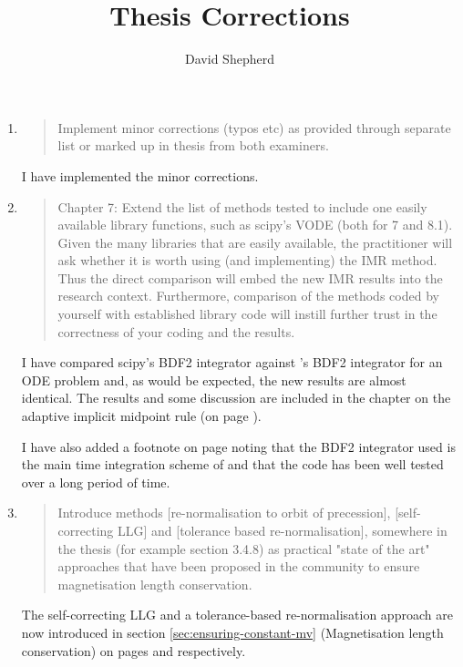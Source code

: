 \documentclass[12pt,a4paper,pdftex]{article}
\title{Thesis Corrections}
\author{David Shepherd}
\begin{document}
\maketitle


\begin{enumerate}
\item
  \begin{quotation}
    Implement minor corrections (typos etc) as provided through
    separate list or marked up in thesis from both examiners.
  \end{quotation}
  I have implemented the minor corrections.

\item
  \begin{quotation}
    Chapter 7: Extend the list of methods tested to include one easily
    available library functions, such as scipy's VODE (both for 7 and
    8.1). Given the many libraries that are easily available, the
    practitioner will ask whether it is worth using (and implementing) the
    IMR method. Thus the direct comparison will embed the new IMR results
    into the research context. Furthermore, comparison of the methods
    coded by yourself with established library code will instill further
    trust in the correctness of your coding and the results.
  \end{quotation}
  I have compared scipy's \vode BDF2 integrator against \oomph's BDF2 integrator for an ODE problem and, as would be expected, the new results are almost identical. The results and some discussion are included in the chapter on the adaptive implicit midpoint rule (on page \pageref{fig:vode-osc-example}).

  I have also added a footnote on page \pageref{corrections-bdf2-well-established-note} noting that the BDF2 integrator used is the main time integration scheme of \oomph and that the code has been well tested over a long period of time.

\item
  \begin{quotation}
    Introduce methods [re-normalisation to orbit of precession],
    [self-correcting LLG] and [tolerance based re-normalisation], somewhere
    in the thesis (for example section 3.4.8) as practical "state of the
    art" approaches that have been proposed in the community to ensure
    magnetisation length conservation.
  \end{quotation}
  The self-correcting LLG and a tolerance-based re-normalisation approach are now introduced in section \ref{sec:ensuring-constant-mv} (Magnetisation length conservation) on pages \pageref{sec:sc-llg} and \pageref{alt-ml-renorm-intro} respectively.


\end{enumerate}
\end{document}

